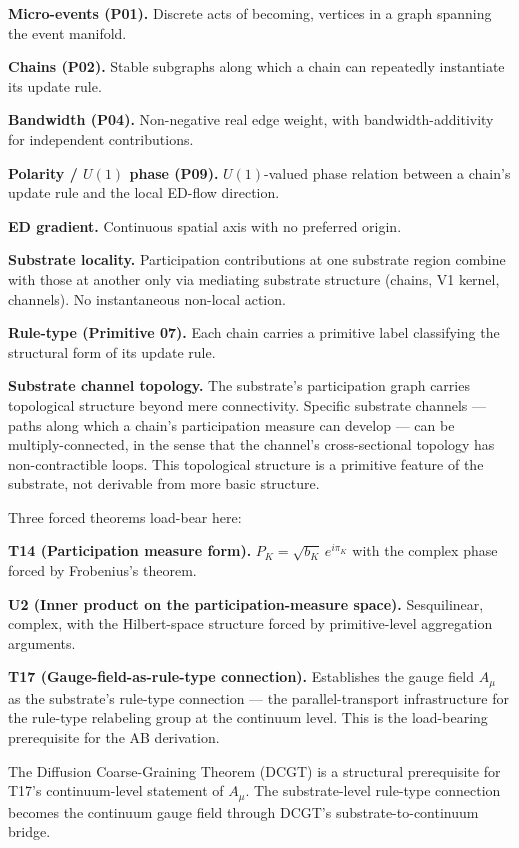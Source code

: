\documentclass[11pt,a4paper]{article}
\begin{document}
\textbf{Micro-events (P01).} Discrete acts of becoming, vertices in a graph spanning the event manifold.

\textbf{Chains (P02).} Stable subgraphs along which a chain can repeatedly instantiate its update rule.

\textbf{Bandwidth (P04).} Non-negative real edge weight, with bandwidth-additivity for independent contributions.

\textbf{Polarity / $U(1)$ phase (P09).} $U(1)$-valued phase relation between a chain's update rule and the local ED-flow direction.

\textbf{ED gradient.} Continuous spatial axis with no preferred origin.

\textbf{Substrate locality.} Participation contributions at one substrate region combine with those at another only via mediating substrate structure (chains, V1 kernel, channels). No instantaneous non-local action.

\textbf{Rule-type (Primitive 07).} Each chain carries a primitive label classifying the structural form of its update rule.

\textbf{Substrate channel topology.} The substrate's participation graph carries topological structure beyond mere connectivity. Specific substrate channels --- paths along which a chain's participation measure can develop --- can be multiply-connected, in the sense that the channel's cross-sectional topology has non-contractible loops. This topological structure is a primitive feature of the substrate, not derivable from more basic structure.

Three forced theorems load-bear here:

\textbf{T14 (Participation measure form).} $P_K = \sqrt{b_K} \, e^{i\pi_K}$ with the complex phase forced by Frobenius's theorem.

\textbf{U2 (Inner product on the participation-measure space).} Sesquilinear, complex, with the Hilbert-space structure forced by primitive-level aggregation arguments.

\textbf{T17 (Gauge-field-as-rule-type connection).} Establishes the gauge field $A_\mu$ as the substrate's rule-type connection --- the parallel-transport infrastructure for the rule-type relabeling group at the continuum level. This is the load-bearing prerequisite for the AB derivation.

The Diffusion Coarse-Graining Theorem (DCGT) is a structural prerequisite for T17's continuum-level statement of $A_\mu$. The substrate-level rule-type connection becomes the continuum gauge field through DCGT's substrate-to-continuum bridge.
\end{document}
